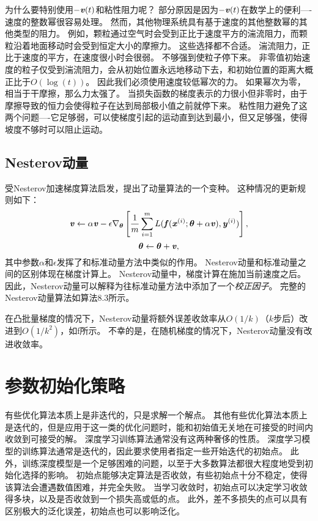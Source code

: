为什么要特别使用$-\boldsymbol{\mathit{v}}(t)$和粘性阻力呢？
部分原因是因为$-\boldsymbol{\mathit{v}}(t)$在数学上的便利----速度的整数幂很容易处理。
然而，其他物理系统具有基于速度的其他整数幂的其他类型的阻力。
例如，颗粒通过空气时会受到正比于速度平方的湍流阻力，而颗粒沿着地面移动时会受到恒定大小的摩擦力。
这些选择都不合适。
湍流阻力，正比于速度的平方，在速度很小时会很弱。
不够强到使粒子停下来。
非零值初始速度的粒子仅受到湍流阻力，会从初始位置永远地移动下去，和初始位置的距离大概正比于$O(\log(t))$。
因此我们必须使用速度较低幂次的力。
如果幂次为零，相当于干摩擦，那么力太强了。
当损失函数的梯度表示的力很小但非零时，由于摩擦导致的恒力会使得粒子在达到局部极小值之前就停下来。
粘性阻力避免了这两个问题----它足够弱，可以使梯度引起的运动直到达到最小，但又足够强，使得坡度不够时可以阻止运动。

\subsection{Nesterov动量}
\label{sec:nesterov_momentum}
受Nesterov加速梯度算法\citep{Nesterov83b,Nesterov03}启发，\cite{sutskeverimportance}提出了动量算法的一个变种。
这种情况的更新规则如下：
\begin{equation}
    \boldsymbol{\mathit{v}} \leftarrow \alpha\boldsymbol{\mathit{v}} - \epsilon \nabla_{\boldsymbol{\theta}} \left[
    \frac{1}{m} \sum_{i=1}^m L( \boldsymbol{\mathit{f}}(\boldsymbol{\mathit{x}}^{(i)}; \boldsymbol{\theta} + \alpha \boldsymbol{\mathit{v}}), \boldsymbol{\mathit{y}}^{(i)} )
 \right],
\end{equation}
\begin{equation}
    \boldsymbol{\theta} \leftarrow \boldsymbol{\theta} + \boldsymbol{\mathit{v}} ,
\end{equation}
其中参数$\alpha$和$\epsilon$发挥了和标准动量方法中类似的作用。 
Nesterov动量和标准动量之间的区别体现在梯度计算上。
Nesterov动量中，梯度计算在施加当前速度之后。
因此，Nesterov动量可以解释为往标准动量方法中添加了一个\emph{校正因子}。
完整的Nesterov动量算法如算法8.3所示。


在凸批量梯度的情况下，Nesterov动量将额外误差收敛率从$O(1/k)$（$k$步后）改进到$O(1/k^2)$，如\cite{Nesterov83b}f所示。
不幸的是，在随机梯度的情况下，Nesterov动量没有改进收敛率。

\section{参数初始化策略}
\label{sec:parameter_initialization_strategies}
有些优化算法本质上是非迭代的，只是求解一个解点。
其他有些优化算法本质上是迭代的，但是应用于这一类的优化问题时，能和初始值无关地在可接受的时间内收敛到可接受的解。
深度学习训练算法通常没有这两种奢侈的性质。
深度学习模型的训练算法通常是迭代的，因此要求使用者指定一些开始迭代的初始点。
此外，训练深度模型是一个足够困难的问题，以至于大多数算法都很大程度地受到初始化选择的影响。
初始点能够决定算法是否收敛，有些初始点十分不稳定，使得该算法会遭遇数值困难，并完全失败。
当学习收敛时，初始点可以决定学习收敛得多块，以及是否收敛到一个损失高或低的点。
此外，差不多损失的点可以具有区别极大的泛化误差，初始点也可以影响泛化。

